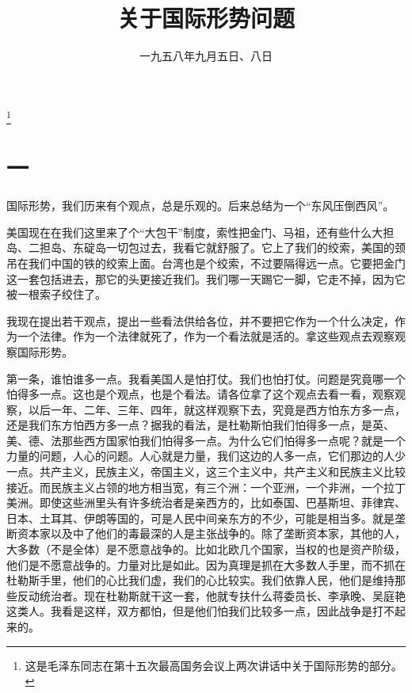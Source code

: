 
\title{关于国际形势问题}
\date{一九五八年九月五日、八日}
\thanks{这是毛泽东同志在第十五次最高国务会议上两次讲话中关于国际形势的部分。}
\maketitle


\section*{一}

国际形势，我们历来有个观点，总是乐观的。后来总结为一个“东风压倒西风”。

美国现在在我们这里来了个“大包干”制度，索性把金门、马祖，还有些什么大担岛、二担岛、东碇岛一切包过去，我看它就舒服了。它上了我们的绞索，美国的颈吊在我们中国的铁的绞索上面。台湾也是个绞索，不过要隔得远一点。它要把金门这一套包括进去，那它的头更接近我们。我们哪一天踢它一脚，它走不掉，因为它被一根索子绞住了。

我现在提出若干观点，提出一些看法供给各位，并不要把它作为一个什么决定，作为一个法律。作为一个法律就死了，作为一个看法就是活的。拿这些观点去观察观察国际形势。

第一条，谁怕谁多一点。我看美国人是怕打仗。我们也怕打仗。问题是究竟哪一个怕得多一点。这也是个观点，也是个看法。请各位拿了这个观点去看一看，观察观察，以后一年、二年、三年、四年，就这样观察下去，究竟是西方怕东方多一点，还是我们东方怕西方多一点？据我的看法，是杜勒斯怕我们怕得多一点，是英、美、德、法那些西方国家怕我们怕得多一点。为什么它们怕得多一点呢？就是一个力量的问题，人心的问题。人心就是力量，我们这边的人多一点，它们那边的人少一点。共产主义，民族主义，帝国主义，这三个主义中，共产主义和民族主义比较接近。而民族主义占领的地方相当宽，有三个洲：一个亚洲，一个非洲，一个拉丁美洲。即使这些洲里头有许多统治者是亲西方的，比如泰国、巴基斯坦、菲律宾、日本、土耳其、伊朗等国的，可是人民中间亲东方的不少，可能是相当多。就是垄断资本家以及中了他们的毒最深的人是主张战争的。除了垄断资本家，其他的人，大多数（不是全体）是不愿意战争的。比如北欧几个国家，当权的也是资产阶级，他们是不愿意战争的。力量对比是如此。因为真理是抓在大多数人手里，而不抓在杜勒斯手里，他们的心比我们虚，我们的心比较实。我们依靠人民，他们是维持那些反动统治者。现在杜勒斯就干这一套，他就专扶什么蒋委员长、李承晚、吴庭艳这类人。我看是这样，双方都怕，但是他们怕我们比较多一点，因此战争是打不起来的。

